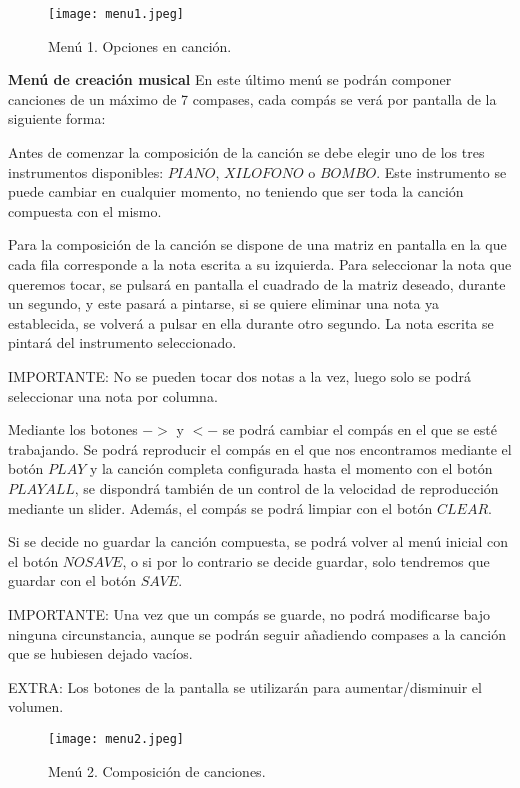 \documentclass[12pt,a4paper]{article}
\begin{document}
\begin{figure}[h!]
\centering
  \texttt{[image: menu1.jpeg]}
  \caption{Menú 1. Opciones en canción.}
  \label{fig:img1}
\end{figure}

\textbf{Menú de creación musical}
En este último menú se podrán componer canciones de un máximo de 7 compases, cada compás se verá por pantalla de la siguiente forma:

Antes de comenzar la composición de la canción se debe elegir uno de los tres instrumentos disponibles: $PIANO$, $XILOFONO$ o $BOMBO$. Este instrumento se puede cambiar en cualquier momento, no teniendo que ser toda la canción compuesta con el mismo.

Para la composición de la canción se dispone de una matriz en pantalla en la que cada fila corresponde a la nota escrita a su izquierda. Para seleccionar la nota que queremos tocar, se pulsará en pantalla el cuadrado de la matriz deseado, durante un segundo, y este pasará a pintarse, si se quiere eliminar una nota ya establecida, se volverá a pulsar en ella durante otro segundo. La nota escrita se pintará del instrumento seleccionado. 

IMPORTANTE: No se pueden tocar dos notas a la vez, luego solo se podrá seleccionar una nota por columna.

Mediante los botones $->$ y $<-$ se podrá cambiar el compás en el que se esté trabajando. Se podrá reproducir el compás en el que nos encontramos mediante el botón $PLAY$ y la canción completa configurada hasta el momento con el botón $PLAY ALL$, se dispondrá también de un control de la velocidad de reproducción mediante un slider. Además, el compás se podrá limpiar con el botón $CLEAR$.

Si se decide no guardar la canción compuesta, se podrá volver al menú inicial con el botón $NO SAVE$, o si por lo contrario se decide guardar, solo tendremos que guardar con el botón $SAVE$. 

IMPORTANTE: Una vez que un compás se guarde, no podrá modificarse bajo ninguna circunstancia, aunque se podrán seguir añadiendo compases a la canción que se hubiesen dejado vacíos.

EXTRA: Los botones de la pantalla se utilizarán para aumentar/disminuir el volumen.

\begin{figure}[h!]
\centering
  \texttt{[image: menu2.jpeg]}
  \caption{Menú 2. Composición de canciones.}
  \label{fig:img1}
\end{figure}
\end{document}
